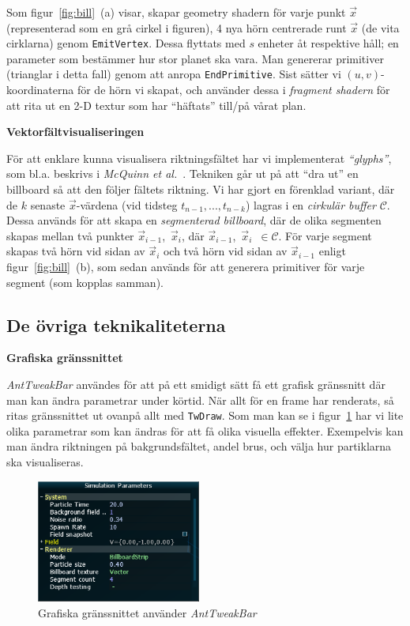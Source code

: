 \documentclass[a4paper]{article}
\begin{document}
\begin{multicols}{2}
Som figur~\ref{fig:bill}~(a) visar, skapar geometry shadern för varje punkt \(\vec{x}\) (representerad som en grå cirkel i figuren), 4 nya hörn centrerade runt \(\vec{x}\) (de vita cirklarna) genom \texttt{EmitVertex}. Dessa flyttats med \(s\) enheter åt respektive håll; en parameter som bestämmer hur stor planet ska vara. Man genererar primitiver (trianglar i detta fall) genom att anropa \texttt{EndPrimitive}. Sist sätter vi \((u, v)\)-koordinaterna för de hörn vi skapat, och använder dessa i \emph{fragment shadern} för att rita ut en 2-D textur som har ``häftats'' till/på vårat plan.

\textbf{Vektorfältvisualiseringen}

För att enklare kunna visualisera riktningsfältet har vi implementerat \emph{``glyphs''}, som bl.a. beskrivs i \emph{McQuinn et al.}~\cite{mcquinn2013glyphsea}. Tekniken går ut på att ``dra ut'' en billboard så att den följer fältets riktning. Vi har gjort en förenklad variant, där de \(k\) senaste \(\vec{x}\)-värdena (vid tidsteg \(t_{n-1}, ..., t_{n-k}\)) lagras i en \emph{cirkulär buffer} \(\mathcal{C}\). Dessa används för att skapa en \emph{segmenterad billboard}, där de olika segmenten skapas mellan två punkter \(\vec{x}_{i-1}\),~\(\vec{x}_i\), där \(\vec{x}_{i-1}\),~\(\vec{x}_i\)~\(\in \mathcal{C}\). För varje segment skapas två hörn vid sidan av \(\vec{x}_i\) och två hörn vid sidan av \(\vec{x}_{i-1}\) enligt figur~\ref{fig:bill}~(b), som sedan används för att generera primitiver för varje segment (som kopplas samman).

\subsection{De övriga teknikaliteterna}

\textbf{Grafiska gränssnittet}

\textit{AntTweakBar} användes för att på ett smidigt sätt få ett grafisk gränssnitt där man kan ändra parametrar under körtid. När allt för en frame har renderats, så ritas gränssnittet ut ovanpå allt med \texttt{TwDraw}. Som man kan se i figur~\ref{fig:atb} har vi lite olika parametrar som kan ändras för att få olika visuella effekter. Exempelvis kan man ändra riktningen på bakgrundsfältet, andel brus, och välja hur partiklarna ska visualiseras.

\begin{figure}[H]
\center
\includegraphics[width=0.48\textwidth]{share/atb.png}
\caption{Grafiska gränssnittet använder \textit{AntTweakBar}}
\label{fig:atb}
\end{figure}


\end{multicols}
\end{document}
